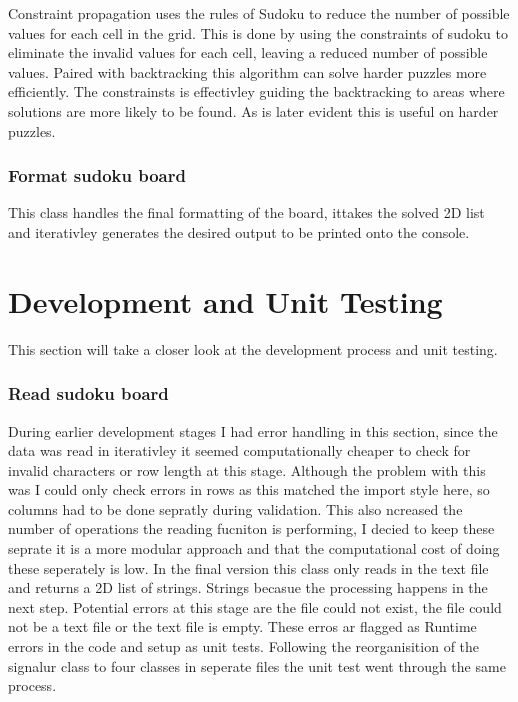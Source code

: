 \documentclass{report}
\begin{document}
Constraint propagation uses the rules of Sudoku to reduce the number of possible values for each cell in the grid.
This is done by using the constraints of sudoku to eliminate the invalid values for each cell, leaving a reduced number of possible values.
Paired with backtracking this algorithm can solve harder puzzles more efficiently. The constrainsts is effectivley guiding the backtracking to areas where solutions are more likely to be found. As is later evident this is useful on harder puzzles.

\subsubsection*{Format sudoku board}
This class handles the final formatting of the board, ittakes the solved 2D list
and iterativley generates the desired output to be printed onto the console.


\section{Development and Unit Testing}
This section will take a closer look at the development process and unit testing.

\subsubsection*{Read sudoku board}
During earlier development stages I had error handling in this section, since the data was read in iterativley
it seemed computationally cheaper to check for invalid characters or row length at this stage.
Although the problem with this was I could only check errors in rows as this matched the import style here,
so columns had to be done sepratly during validation. This also ncreased the number of operations
the reading fucniton is performing, I decied to keep these seprate it is a more modular approach and that the computational cost of doing these seperately is low.
In the final version this class only reads in the text file and returns a 2D list of strings. Strings becasue the processing happens in the next step.
Potential errors at this stage are the file could not exist, the file could not be a text file or the text file is empty.
These erros ar flagged as Runtime errors in the code and setup as unit tests.
Following the reorganisition of the signalur class to four classes in seperate files the unit test went through the same process.
\end{document}
